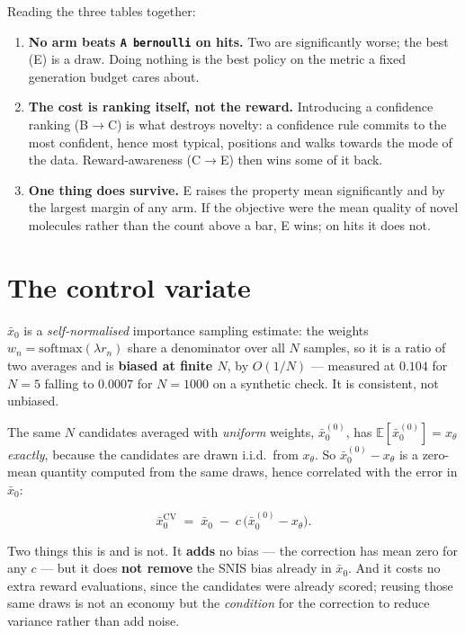 \documentclass[11pt]{article}
\begin{document}
Reading the three tables together:

\begin{enumerate}
  \item \textbf{No arm beats \texttt{A bernoulli} on hits.} Two are
        significantly worse; the best (E) is a draw. Doing nothing is the best
        policy on the metric a fixed generation budget cares about.
  \item \textbf{The cost is ranking itself, not the reward.} Introducing a
        confidence ranking (B$\to$C) is what destroys novelty: a confidence rule
        commits to the most confident, hence most typical, positions and walks
        towards the mode of the data. Reward-awareness (C$\to$E) then wins some
        of it back.
  \item \textbf{One thing does survive.} E raises the property mean
        significantly and by the largest margin of any arm. If the objective
        were the mean quality of novel molecules rather than the count above a
        bar, E wins; on hits it does not.
\end{enumerate}

\section{The control variate}\label{sec:cv}

$\bar{x}_0$ is a \emph{self-normalised} importance sampling estimate: the weights
$w_n = \mathrm{softmax}(\lambda r_n)$ share a denominator over all $N$ samples, so
it is a ratio of two averages and is \textbf{biased at finite $N$}, by
$O(1/N)$ --- measured at $0.104$ for $N{=}5$ falling to $0.0007$ for $N{=}1000$
on a synthetic check. It is consistent, not unbiased.

The same $N$ candidates averaged with \emph{uniform} weights,
$\bar{x}_0^{(0)}$, has $\mathbb{E}[\bar{x}_0^{(0)}] = x_\theta$ \emph{exactly},
because the candidates are drawn i.i.d.\ from $x_\theta$. So
$\bar{x}_0^{(0)} - x_\theta$ is a zero-mean quantity computed from the same
draws, hence correlated with the error in $\bar{x}_0$:

\[ \bar{x}_0^{\mathrm{CV}} \;=\; \bar{x}_0 \;-\; c\,\bigl(\bar{x}_0^{(0)} - x_\theta\bigr). \]

Two things this is and is not. It \textbf{adds} no bias --- the correction has
mean zero for any $c$ --- but it does \textbf{not remove} the SNIS bias already
in $\bar{x}_0$. And it costs no extra reward evaluations, since the candidates
were already scored; reusing those same draws is not an economy but the
\emph{condition} for the correction to reduce variance rather than add noise.
\end{document}
